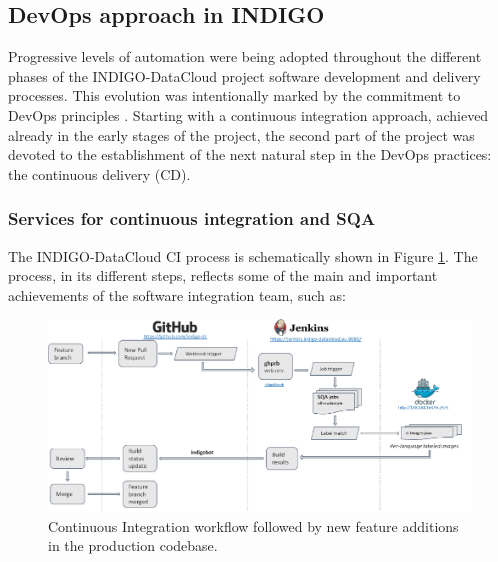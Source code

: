 \documentclass{article}
\begin{document}
\subsection{DevOps approach in INDIGO}

Progressive levels of automation were being adopted throughout
the different phases of the INDIGO-DataCloud project software development and
delivery processes. This evolution was intentionally marked by the commitment
to DevOps principles \cite{devops}. Starting with a continuous integration
approach, achieved already in the early stages of the project, the second part
of the project was devoted to the establishment of the next natural step in the
DevOps practices: the continuous delivery (CD).

\subsubsection{Services for continuous integration and SQA}

The INDIGO-DataCloud CI process is schematically shown
in Figure \ref{fig:8}. The process, in its different steps, reflects some of
the main and important achievements of the software integration team, such as:

\begin{figure}
  \centering
  \includegraphics[width=\textwidth]{./figs/Figure8.pdf}
  \caption{Continuous Integration workflow followed by new feature additions in the production codebase.}
  \label{fig:8}
\end{figure}
\end{document}
